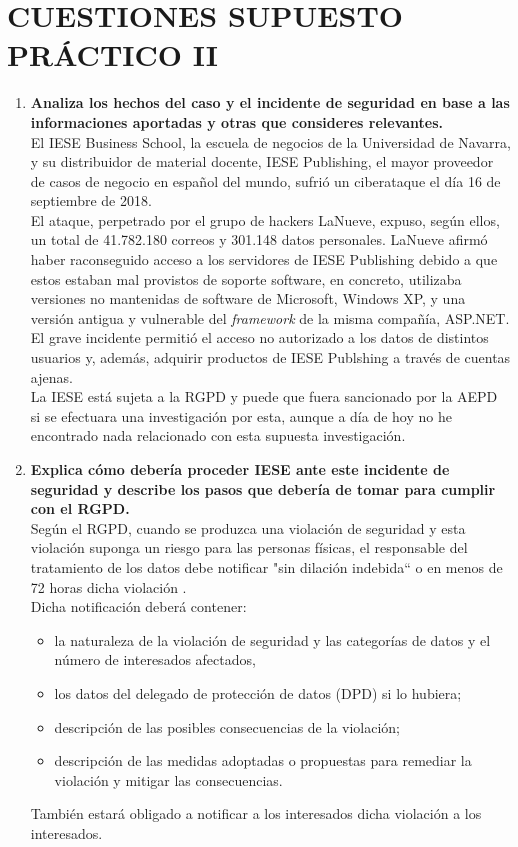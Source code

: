 \documentclass[10pt,a4paper]{article}
\begin{document}
\section{CUESTIONES SUPUESTO PRÁCTICO II}
\begin{enumerate}
\item \textbf{Analiza los hechos del caso y el incidente de seguridad en base a las informaciones aportadas y otras que consideres relevantes.}\\
El IESE Business School, la escuela de negocios de la Universidad de Navarra, y su distribuidor de material docente, IESE Publishing, el mayor proveedor de casos de negocio en español del mundo, sufrió un ciberataque el día 16 de septiembre de 2018.\\
El ataque, perpetrado por el grupo de hackers LaNueve, expuso, según ellos, un total de 41.782.180 correos y 301.148 datos personales. LaNueve afirmó haber raconseguido acceso a los servidores de IESE Publishing debido a que estos estaban mal provistos de soporte software, en concreto, utilizaba versiones no mantenidas de software de Microsoft, Windows XP, y una versión antigua y vulnerable del \textit{framework} de la misma compañía, ASP.NET.\\
El grave incidente permitió el acceso no autorizado a los datos de distintos usuarios y, además, adquirir productos de IESE Publshing a través de cuentas ajenas.\\

La IESE está sujeta a la RGPD y puede que fuera sancionado por la AEPD si se efectuara una investigación por esta, aunque a día de hoy no he encontrado nada relacionado con esta supuesta investigación.

\item \textbf{Explica cómo debería proceder IESE ante este incidente de seguridad y
describe los pasos que debería de tomar para cumplir con el RGPD.}\\
Según el RGPD, cuando se produzca una violación de seguridad y esta violación suponga un riesgo para las personas físicas, el responsable del tratamiento de los datos debe notificar "sin dilación indebida`` o en menos de 72 horas dicha violación \cite[art 33]{RGPD}.\\
Dicha notificación deberá contener:
\begin{itemize}
\item la naturaleza de la violación de seguridad y las categorías de datos y el número de interesados afectados,
\item los datos del delegado de protección de datos (DPD) si lo hubiera;
\item descripción de las posibles consecuencias de la violación;
\item descripción de las medidas adoptadas o propuestas para remediar la violación y mitigar las consecuencias.
\end{itemize}
También estará obligado a notificar a los interesados dicha violación a los interesados.


\end{enumerate}
\end{document}
